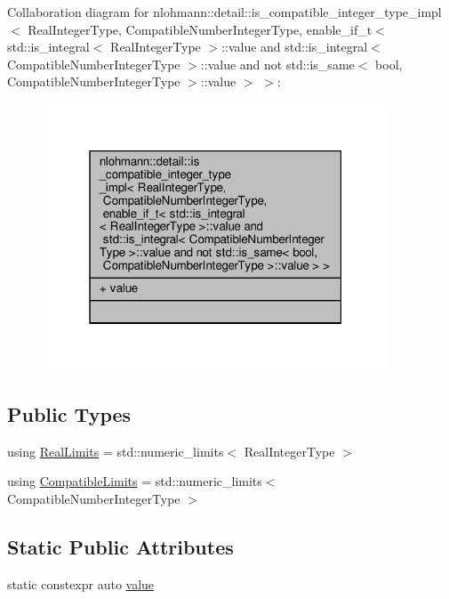 Collaboration diagram for nlohmann\+:\+:detail\+:\+:is\+\_\+compatible\+\_\+integer\+\_\+type\+\_\+impl$<$ Real\+Integer\+Type, Compatible\+Number\+Integer\+Type, enable\+\_\+if\+\_\+t$<$ std\+:\+:is\+\_\+integral$<$ Real\+Integer\+Type $>$\+:\+:value and std\+:\+:is\+\_\+integral$<$ Compatible\+Number\+Integer\+Type $>$\+:\+:value and not std\+:\+:is\+\_\+same$<$ bool, Compatible\+Number\+Integer\+Type $>$\+:\+:value $>$ $>$\+:\nopagebreak
\begin{figure}[H]
\begin{center}
\leavevmode
\includegraphics[width=292pt]{structnlohmann_1_1detail_1_1is__compatible__integer__type__impl_3_01_real_integer_type_00_01_coma285f188adfd07387075be56b8d64b2d}
\end{center}
\end{figure}
\subsection*{Public Types}
\begin{DoxyCompactItemize}
\item 
using \hyperlink{structnlohmann_1_1detail_1_1is__compatible__integer__type__impl_3_01_real_integer_type_00_01_com5aa74bcf254245a639da00509f4d2655_a0e9f2586c4de25750563770c9388ab9f}{Real\+Limits} = std\+::numeric\+\_\+limits$<$ Real\+Integer\+Type $>$
\item 
using \hyperlink{structnlohmann_1_1detail_1_1is__compatible__integer__type__impl_3_01_real_integer_type_00_01_com5aa74bcf254245a639da00509f4d2655_a002983b5c7c0f72b89d2151a6b39627d}{Compatible\+Limits} = std\+::numeric\+\_\+limits$<$ Compatible\+Number\+Integer\+Type $>$
\end{DoxyCompactItemize}
\subsection*{Static Public Attributes}
\begin{DoxyCompactItemize}
\item 
static constexpr auto \hyperlink{structnlohmann_1_1detail_1_1is__compatible__integer__type__impl_3_01_real_integer_type_00_01_com5aa74bcf254245a639da00509f4d2655_a478242daac7a70e28c749bfec00d1c1b}{value}
\end{DoxyCompactItemize}



